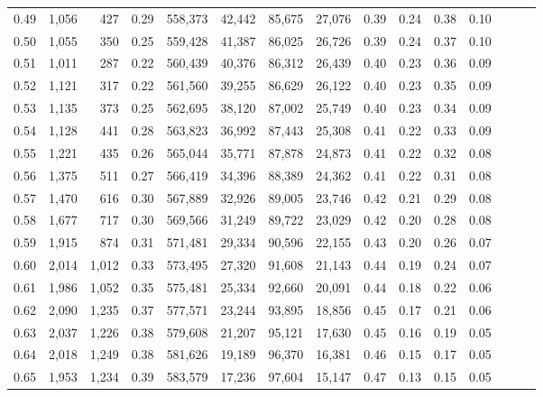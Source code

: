 \begin{tabular}{rrrrrrrrrrrrrrr}
0.49 &   1,056 &    427 &  0.29 &  558,373 &   42,442 &   85,675 &   27,076 &  0.39 &  0.24 &  0.38 &      0.10 \\
0.50 &   1,055 &    350 &  0.25 &  559,428 &   41,387 &   86,025 &   26,726 &  0.39 &  0.24 &  0.37 &      0.10 \\
0.51 &   1,011 &    287 &  0.22 &  560,439 &   40,376 &   86,312 &   26,439 &  0.40 &  0.23 &  0.36 &      0.09 \\
0.52 &   1,121 &    317 &  0.22 &  561,560 &   39,255 &   86,629 &   26,122 &  0.40 &  0.23 &  0.35 &      0.09 \\
0.53 &   1,135 &    373 &  0.25 &  562,695 &   38,120 &   87,002 &   25,749 &  0.40 &  0.23 &  0.34 &      0.09 \\
0.54 &   1,128 &    441 &  0.28 &  563,823 &   36,992 &   87,443 &   25,308 &  0.41 &  0.22 &  0.33 &      0.09 \\
0.55 &   1,221 &    435 &  0.26 &  565,044 &   35,771 &   87,878 &   24,873 &  0.41 &  0.22 &  0.32 &      0.08 \\
0.56 &   1,375 &    511 &  0.27 &  566,419 &   34,396 &   88,389 &   24,362 &  0.41 &  0.22 &  0.31 &      0.08 \\
0.57 &   1,470 &    616 &  0.30 &  567,889 &   32,926 &   89,005 &   23,746 &  0.42 &  0.21 &  0.29 &      0.08 \\
0.58 &   1,677 &    717 &  0.30 &  569,566 &   31,249 &   89,722 &   23,029 &  0.42 &  0.20 &  0.28 &      0.08 \\
0.59 &   1,915 &    874 &  0.31 &  571,481 &   29,334 &   90,596 &   22,155 &  0.43 &  0.20 &  0.26 &      0.07 \\
0.60 &   2,014 &  1,012 &  0.33 &  573,495 &   27,320 &   91,608 &   21,143 &  0.44 &  0.19 &  0.24 &      0.07 \\
0.61 &   1,986 &  1,052 &  0.35 &  575,481 &   25,334 &   92,660 &   20,091 &  0.44 &  0.18 &  0.22 &      0.06 \\
0.62 &   2,090 &  1,235 &  0.37 &  577,571 &   23,244 &   93,895 &   18,856 &  0.45 &  0.17 &  0.21 &      0.06 \\
0.63 &   2,037 &  1,226 &  0.38 &  579,608 &   21,207 &   95,121 &   17,630 &  0.45 &  0.16 &  0.19 &      0.05 \\
0.64 &   2,018 &  1,249 &  0.38 &  581,626 &   19,189 &   96,370 &   16,381 &  0.46 &  0.15 &  0.17 &      0.05 \\
0.65 &   1,953 &  1,234 &  0.39 &  583,579 &   17,236 &   97,604 &   15,147 &  0.47 &  0.13 &  0.15 &      0.05 \\

\end{tabular}
